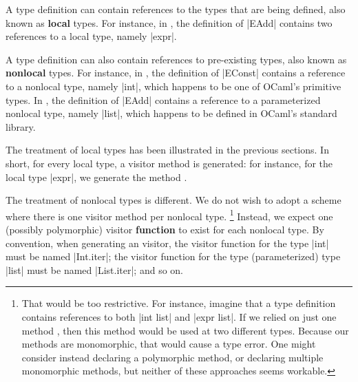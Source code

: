 \documentclass[onecolumn,11pt,nocopyrightspace]{sigplanconf}
\renewcommand{\emph}[1]{\textbf{#1}}
\begin{document}
A type definition can contain references to the types that are being defined,
also known as \emph{local} types. For instance, in , the
definition of \oc|EAdd| contains two references to a local type, namely
\oc|expr|.

A type definition can also contain references to pre-existing types, also
known as \emph{nonlocal} types. For instance, in , the
definition of \oc|EConst| contains a reference to a nonlocal type, namely
\oc|int|, which happens to be one of OCaml's primitive types. In
, the definition of \oc|EAdd| contains a reference to a
parameterized nonlocal type, namely \oc|list|, which happens to be defined in
OCaml's standard library.

The treatment of local types has been illustrated in the previous sections.
In short, for every local type, a visitor method is generated: for instance,
for the local type \oc|expr|, we generate the method .

The treatment of nonlocal types is different. We do not wish to adopt a scheme
where there is one visitor method per nonlocal type.%
%
\footnote{That would be too restrictive. For instance, imagine that a type
  definition contains references to both \oc|int list| and \oc|expr list|. If
  we relied on just one method , then this method would be
  used at two different types. Because our methods are monomorphic, that would
  cause a type error. One might consider instead declaring a polymorphic
  method, or declaring multiple monomorphic methods, but neither of these
  approaches seems workable.}
%
Instead, we expect one (possibly polymorphic) visitor \emph{function} to exist
for each nonlocal type. By convention, when generating an \iter visitor, the
visitor function for the type \oc|int| must be named \oc|Int.iter|; the
visitor function for the type (parameterized) type \oc|list| must be named
\oc|List.iter|; and so on.





\end{document}

